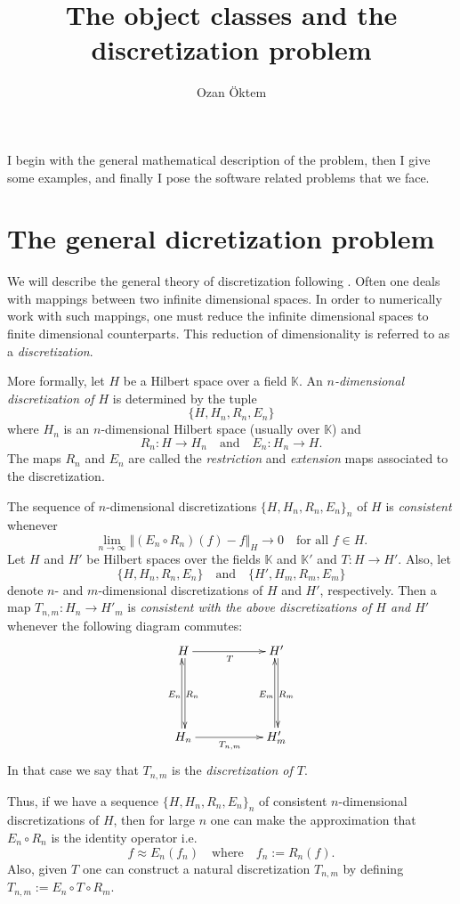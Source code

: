 \documentclass[a4paper]{article}
\title{The object classes and the discretization problem}
\author{Ozan \"Oktem}
\newcommand{\K}{\mathbb{K}}
\begin{document}
\maketitle

I begin with the general mathematical description of 
the problem, then I give some examples, and finally I pose the software 
related problems that we face.

\section{The general dicretization problem}
We will describe the general theory of discretization following 
\cite[Chapter~34]{ZeIIB85}. Often one deals with mappings between 
two infinite dimensional spaces. In order to numerically work with such 
mappings, one must reduce the infinite dimensional spaces to finite 
dimensional counterparts. This reduction of dimensionality is 
referred to as a \emph{discretization}. 

More formally, let $H$ be a Hilbert space over a field $\K$. 
An \emph{$n$-dimensional 
discretization of $H$} is determined by the tuple
\[ \bigl\{ H,H_{n},R_{n},E_{n} \bigr\} \]
where $H_{n}$ is an $n$-dimensional Hilbert space (usually over $\K$) and 
\[ R_{n} \colon H \to H_{n}
   \quad\text{and}\quad
   E_{n} \colon H_{n} \to H. \]
The maps $R_{n}$ and $E_{n}$ are called the  \emph{restriction} and 
\emph{extension} maps associated to the discretization. 
\begin{Def}
  The sequence of $n$-dimensional discretizations $\bigl\{ 
  H,H_{n},R_{n},E_{n} \bigr\}_{n}$ of $H$ is \emph{consistent} whenever
  \[ \lim_{n\to \infty} 
     \bigl\Vert ( E_{n}\circ R_{n})(f)-f \bigr\Vert_{H}\to 0
     \quad\text{for all $f\in H$.}\]
  Let $H$ and $H'$ be Hilbert spaces over the fields $\K$ and $\K'$ 
  and $T \colon H \to H'$. Also, let 
  \[ \bigl\{ H,H_{n},R_{n},E_{n} \bigr\} 
     \quad\text{and}\quad
     \bigl\{ H',H_{m},R_{m},E_{m} \bigr\}\]
  denote $n$- and $m$-dimensional discretizations of $H$ and $H'$, 
  respectively. Then a map $T_{n,m} \colon H_{n} \to H'_{m}$ is 
  \emph{consistent with the above discretizations of $H$ and $H'$} 
  whenever the following diagram commutes:
  \[ \xymatrix{
      H \ar[rr]_{T} \ar@<0.3ex>[dd]_{E_{n}} & &  
      H' \ar@<0.3ex>[dd]_{E_{m}} \\
       & &  \\
      H_{n} \ar@<0.3ex>[uu]_{R_{n}} \ar[rr]_{T_{n,m}}  & &     
      H'_{m} \ar@<0.3ex>[uu]_{R_{m}}  }
  \]
  In that case we say that $T_{n,m}$ is the \emph{discretization of $T$}.
\end{Def}  
Thus, if we have a sequence $\bigl\{ H,H_{n},R_{n},E_{n} \bigr\}_{n}$ 
of consistent $n$-dimensional discretizations of $H$, 
then for large $n$ one can make the approximation that $E_{n}\circ 
R_{n}$ is the identity operator i.e.\@
\begin{equation}\label{eq:fApprox}
    f \approx E_{n}(f_{n}) \quad\text{where}\quad
    f_{n}:=R_{n}(f).
\end{equation}  
Also, given $T$ one can construct a natural discretization $T_{n,m}$ 
by defining $T_{n,m}:= E_{n} \circ T \circ R_{m}$.
\end{document}
